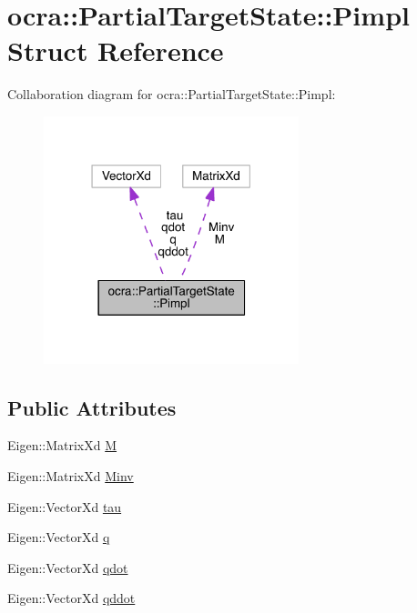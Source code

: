 \hypertarget{structocra_1_1PartialTargetState_1_1Pimpl}{}\section{ocra\+:\+:Partial\+Target\+State\+:\+:Pimpl Struct Reference}
\label{structocra_1_1PartialTargetState_1_1Pimpl}


Collaboration diagram for ocra\+:\+:Partial\+Target\+State\+:\+:Pimpl\+:\nopagebreak
\begin{figure}[H]
\begin{center}
\leavevmode
\includegraphics[width=210pt]{dc/d0b/structocra_1_1PartialTargetState_1_1Pimpl__coll__graph}
\end{center}
\end{figure}
\subsection*{Public Attributes}
\begin{DoxyCompactItemize}
\item 
Eigen\+::\+Matrix\+Xd \hyperlink{structocra_1_1PartialTargetState_1_1Pimpl_acf8d5f65cf416eda2285044fb31e16dd}{M}
\item 
Eigen\+::\+Matrix\+Xd \hyperlink{structocra_1_1PartialTargetState_1_1Pimpl_a14905360b00dea81b81fd48960fbe7a5}{Minv}
\item 
Eigen\+::\+Vector\+Xd \hyperlink{structocra_1_1PartialTargetState_1_1Pimpl_a68194144a3fdbdb73744178332101ed0}{tau}
\item 
Eigen\+::\+Vector\+Xd \hyperlink{structocra_1_1PartialTargetState_1_1Pimpl_a0d72ffd9b45ff335dee37874459dfc8d}{q}
\item 
Eigen\+::\+Vector\+Xd \hyperlink{structocra_1_1PartialTargetState_1_1Pimpl_a788a4c8818c07f7cd401d3a7cf1cf5c4}{qdot}
\item 
Eigen\+::\+Vector\+Xd \hyperlink{structocra_1_1PartialTargetState_1_1Pimpl_ae9c10dd0f603be49ec43fdf69f8d6556}{qddot}
\end{DoxyCompactItemize}



